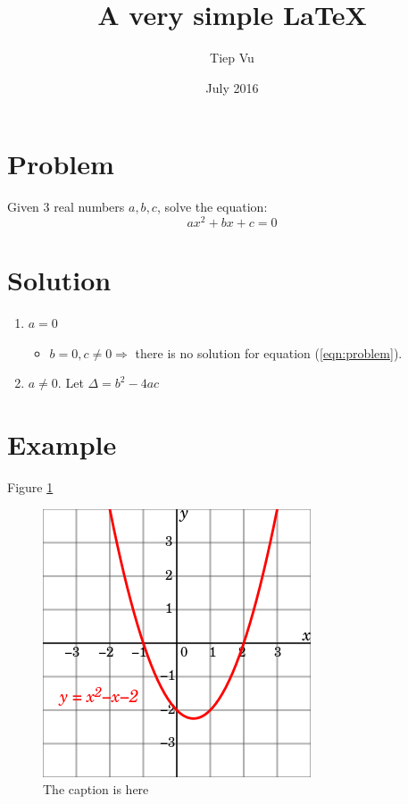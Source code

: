 \documentclass{article}
\title{A very simple LaTeX}
\author{Tiep Vu}
\date{July 2016}
\begin{document}
\maketitle
\section{Problem} %
\label{sec:problem}
Given 3 real numbers $a, b, c$, solve the equation:
\begin{equation}
\label{eqn:problem}
    ax^2 + bx + c = 0 
\end{equation}

\section{Solution} %
\label{sec:solution}
\begin{enumerate}
	\item $a = 0$
	\begin{itemize}
		\item $b = 0, c \neq 0 \Rightarrow$ there is no solution for equation (\ref{eqn:problem}).
	\end{itemize}
	\item $a \neq 0 $. Let $\Delta = b^2 - 4ac$
\end{enumerate}

\section{Example} %
\label{sec:example}
Figure \ref{fig:graph1}
\begin{figure}[h]
\centering
	\includegraphics[scale = 0.3]{figs/fig1.png}
	\caption{The caption is here}
	\label{fig:graph1}
\end{figure}
\end{document}
